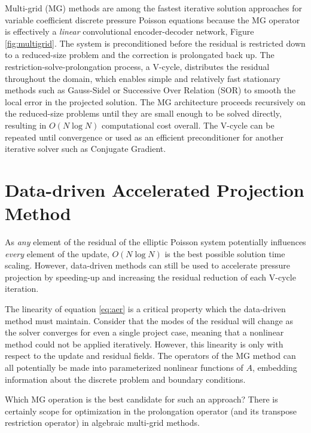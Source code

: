 \documentclass[review]{elsarticle}
\begin{document}
Multi-grid (MG) methods are among the fastest iterative solution approaches for variable coefficient discrete pressure Poisson equations because the MG operator is effectively a \textit{linear} convolutional encoder-decoder network, Figure \ref{fig:multigrid}. The system is preconditioned before the residual is restricted down to a reduced-size problem and the correction is prolongated back up. 
The restriction-solve-prolongation process, a V-cycle, distributes the residual throughout the domain, which enables simple and relatively fast stationary methods such as Gauss-Sidel or Successive Over Relation (SOR) to smooth the local error in the projected solution. The MG architecture proceeds recursively on the reduced-size problems until they are small enough to be solved directly, resulting in $O(N\log N)$ computational cost overall. The V-cycle can be repeated until convergence or used as an efficient preconditioner for another iterative solver such as Conjugate Gradient. 

\section{Data-driven Accelerated Projection Method}

As \textit{any} element of the residual of the elliptic Poisson system potentially influences \textit{every} element of the update, $O(N\log N)$ is the best possible solution time scaling. However, data-driven methods can still be used to accelerate pressure projection by speeding-up and increasing the residual reduction of each V-cycle iteration.

The linearity of equation \ref{eq:aer} is a critical property which the data-driven method must maintain. Consider that the modes of the residual will change as the solver converges for even a single project case, meaning that a nonlinear method could not be applied iteratively. However, this linearity is only with respect to the update and residual fields. The operators of the MG method can all potentially be made into parameterized nonlinear functions of $A$, embedding information about the discrete problem and boundary conditions. 

Which MG operation is the best candidate for such an approach? There is certainly scope for optimization in the prolongation operator (and its transpose restriction operator) in algebraic multi-grid methods. 
\end{document}
